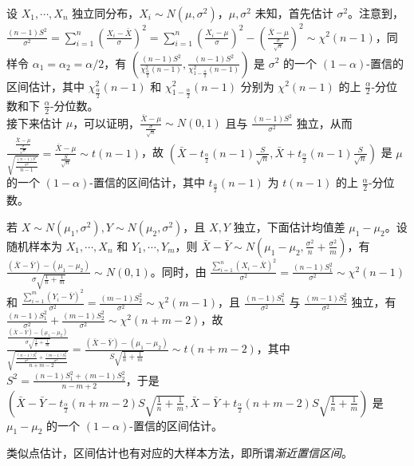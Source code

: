 \documentclass[../main.tex]{subfiles}
\begin{document}
\begin{example}
    设 $X_1,\cdots,X_n$ 独立同分布，$X_i\sim N(\mu,\sigma^2)$，$\mu,\sigma^2$ 未知，首先估计 $\sigma^2$。注意到，$\frac{(n-1)S^2}{\sigma^2}=\sum_{i=1}^n\left(\frac{X_i-\bar X}{\sigma}\right)^2=\sum_{i=1}^n\left(\frac{X_i-\mu}{\sigma}\right)^2-\left(\frac{\bar X-\mu}{\frac\sigma{\sqrt{n}}}\right)^2\sim\chi^2(n-1)$，同样令 $\alpha_1=\alpha_2=\alpha/2$，有 $(\frac{(n-1)S^2}{\chi^2_{\frac\alpha2}(n-1)},\frac{(n-1)S^2}{\chi^2_{1-\frac\alpha2}(n-1)})$ 是 $\sigma^2$ 的一个 $(1-\alpha)$-置信的区间估计，其中 $\chi^2_{\frac\alpha2}(n-1)$ 和 $\chi^2_{1-\frac\alpha2}(n-1)$ 分别为 $\chi^2(n-1)$ 的上 $\frac\alpha2$-分位数和下 $\frac\alpha2$-分位数。\\
    接下来估计 $\mu$，可以证明，$\frac{\bar X-\mu}{\frac\sigma{\sqrt{n}}}\sim N(0,1)$ 且与 $\frac{(n-1)S^2}{\sigma^2}$ 独立，从而 $\frac{\frac{\bar X-\mu}{\frac\sigma{\sqrt{n}}}}{\sqrt{\frac{\frac{(n-1)S^2}{\sigma^2}}{n-1}}}=\frac{\bar X-\mu}{\frac S{\sqrt{n}}}\sim t(n-1)$，故 $(\bar X-t_{\frac\alpha2}(n-1)\frac S{\sqrt{n}},\bar X+t_{\frac\alpha2}(n-1)\frac S{\sqrt{n}})$ 是 $\mu$ 的一个 $(1-\alpha)$-置信的区间估计，其中 $t_{\frac\alpha2}(n-1)$ 为 $t(n-1)$ 的上 $\frac\alpha2$-分位数。
\end{example}

\begin{example}
    若 $X\sim N(\mu_1,\sigma^2),Y\sim N(\mu_2,\sigma^2)$，且 $X,Y$ 独立，下面估计均值差 $\mu_1-\mu_2$。设随机样本为 $X_1,\cdots,X_n$ 和 $Y_1,\cdots,Y_m$，则 $\bar X-\bar Y\sim N(\mu_1-\mu_2,\frac{\sigma^2}n+\frac{\sigma^2}m)$，有 $\frac{(\bar X-\bar Y)-(\mu_1-\mu_2)}{\sigma\sqrt{\frac1n+\frac1m}}\sim N(0,1)$。同时，由 $\frac{\sum_{i=1}^n(X_i-\bar X)^2}{\sigma^2}=\frac{(n-1)S_1^2}{\sigma^2}\sim\chi^2(n-1)$ 和 $\frac{\sum_{i=1}^m(Y_i-\bar Y)^2}{\sigma^2}= \frac{(m-1)S_2^2}{\sigma^2}\sim\chi^2(m-1)$，且 $\frac{(n-1)S_1^2}{\sigma^2}$ 与 $\frac{(m-1)S_2^2}{\sigma^2}$ 独立，有 $\frac{(n-1)S_1^2}{\sigma^2}+\frac{(m-1)S_2^2}{\sigma^2}\sim\chi^2(n+m-2)$，故 $\frac{\frac{(\bar X-\bar Y)-(\mu_1-\mu_2)}{\sigma\sqrt{\frac1n+\frac1m}}}{\sqrt{\frac{\frac{(n-1)S_1^2}{\sigma^2}+\frac{(m-1)S_2^2}{\sigma^2}}{n+m-2}}}=\frac{(\bar X-\bar Y)-(\mu_1-\mu_2)}{S\sqrt{\frac1n+\frac1m}}\sim t(n+m-2)$，其中 $S^2=\frac{(n-1)S_1^2+(m-1)S_2^2}{n-m+2}$，于是 $(\bar X-\bar Y-t_{\frac\alpha2}(n+m-2)S\sqrt{\frac1n+\frac1m},\bar X-\bar Y+t_{\frac\alpha2}(n+m-2)S\sqrt{\frac1n+\frac1m})$ 是 $\mu_1-\mu_2$ 的一个 $(1-\alpha)$-置信的区间估计。
\end{example}

类似点估计，区间估计也有对应的大样本方法，即所谓\emph{渐近置信区间}。
\end{document}
